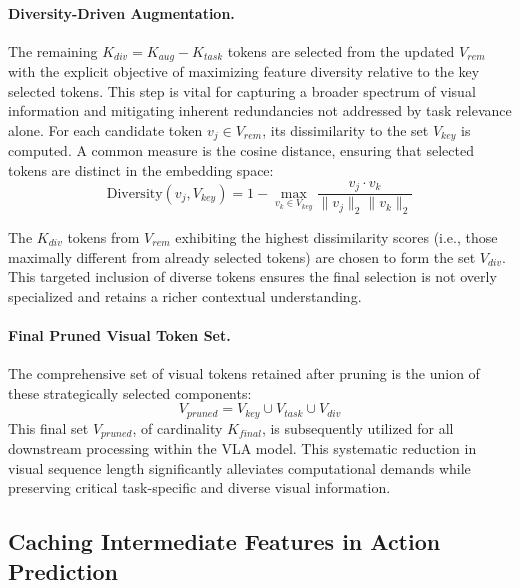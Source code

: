 \paragraph{Diversity-Driven Augmentation.}
The remaining $K_{div} = K_{aug} - K_{task}$ tokens are selected from the updated $V_{rem}$ with the explicit objective of maximizing feature diversity relative to the key selected tokens. This step is vital for capturing a broader spectrum of visual information and mitigating inherent redundancies not addressed by task relevance alone. For each candidate token $v_j \in V_{rem}$, its dissimilarity to the set $V_{key}$ is computed. A common measure is the cosine distance, ensuring that selected tokens are distinct in the embedding space:
\begin{equation}
    \text{Diversity}(v_j, V_{key}) = 1 - \max_{v_k \in V_{key}} \frac{v_j \cdot v_k}{\|v_j\|_2 \|v_k\|_2}
    \label{eq:dissimilarity}
\end{equation}


The $K_{div}$ tokens from $V_{rem}$ exhibiting the highest dissimilarity scores (i.e., those maximally different from already selected tokens) are chosen to form the set $V_{div}$. This targeted inclusion of diverse tokens ensures the final selection is not overly specialized and retains a richer contextual understanding.

\paragraph{Final Pruned Visual Token Set.}
The comprehensive set of visual tokens retained after pruning is the union of these strategically selected components:
\begin{equation}
    V_{pruned} = V_{key} \cup V_{task} \cup V_{div}
\end{equation}
This final set $V_{pruned}$, of cardinality $K_{final}$, is subsequently utilized for all downstream processing within the VLA model. This systematic reduction in visual sequence length significantly alleviates computational demands while preserving critical task-specific and diverse visual information. 

\subsection{Caching Intermediate Features in Action Prediction}

